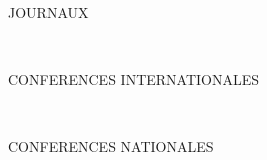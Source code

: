 

\manualmark
{} %
{}
\label{app:publications}



\begin{refsection}[ownpubs]

  \noindent JOURNAUX
  \small
  \nocite{soulej2025jaamas}
  \printbibliography[keyword=journal, heading=none, sorting=ydnt]

  \

  \noindent CONFERENCES INTERNATIONALES
  \small
  \nocite{soulej2025cloud}
  \nocite{soule2024moise_marl}
  \nocite{soule2024marl}
  \nocite{soulej2023sim}
  \printbibliography[keyword=international, heading=none, sorting=ydnt]

  \

  \normalsize
  \noindent CONFERENCES NATIONALES
  \small
  \nocite{soule2025jfsma}
  \nocite{soule2024outil}
  \nocite{soule2024approche}
  \nocite{soule2023jfsmathese}
  \nocite{soule2023ressithese}
  \nocite{soule2023rjciathese}
  \printbibliography[keyword=national, heading=none, sorting=ydnt]

\end{refsection}
